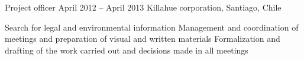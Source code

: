 \begin{joblist}[13.2][7.8][3.4]
\item[Project officer]{April 2012 -- April 2013 }
	{Killahue corporation, Santiago, Chile}     
	{
		\iftbftiny \setlength{\parskip}{-10pt} \fi
		\begin{itemize}
			  \iftbftiny \setlength\itemsep{-3pt} \fi
			  \cvitem[\checkmark] Search for legal and environmental information
			  \cvitem[\checkmark] Management and coordination of meetings and preparation of visual and written materials
			  \cvitem[\checkmark] Formalization and drafting of the work carried out and decisions made in all meetings
		\end{itemize}      
	}
  
       

   

\end{joblist}

%
%

